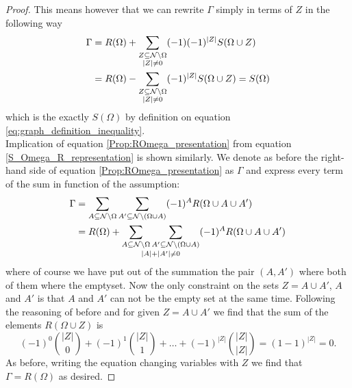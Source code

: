 \documentclass[10pt, a4paper]{amsart}
\begin{document}
\begin{proof}
This means however that we can rewrite $\Gamma$ simply in terms of $Z$ in the following way 
\begin{align*}
\Gamma &= R(\Omega) + 
\sum_{
\substack{Z\subseteq \mathcal{N}\backslash \Omega \\
|Z| \neq 0}}
(-1)(-1)^{|Z|}S(\Omega \cup Z)\\
& = 
R(\Omega) -
\sum_{
\substack{
Z\subseteq \mathcal{N}\backslash \Omega \\
|Z| \neq 0}}
(-1)^{|Z|}S(\Omega \cup Z) = S(\Omega)
\end{align*}
which is the exactly $S(\Omega)$ by definition on equation \ref{eq:graph_definition_inequality}. \\

Implication of equation \ref{Prop:ROmega_presentation} from equation \ref{S_Omega_R_representation} is shown similarly. We denote as before the right-hand side of equation \ref{Prop:ROmega_presentation} as $\Gamma$ and express every term of the sum in function of the assumption:
\begin{align*}
\Gamma &=
 \sum_{A\subseteq \mathcal{N} \backslash \Omega}\sum_{A'\subseteq \mathcal{N} \backslash (\Omega \cup A)}(-1)^{A}  R(\Omega \cup A \cup A')\\
 &= R(\Omega ) + 
 \underset{|A|+|A'|\neq 0}{\sum_{A\subseteq \mathcal{N} \backslash \Omega}\sum_{A'\subseteq \mathcal{N} \backslash (\Omega \cup A)}}
 (-1)^{A}  R(\Omega \cup A \cup A')
\end{align*}
where of course we have put out of the summation the pair $(A, A')$ where both of them where the emptyset. Now the only constraint on the sets $Z = A \cup A'$, $A$ and $A'$ is that $A$ and $A'$ can not be the empty set at the same time. Following the reasoning of before and for given $Z = A \cup A'$ we find that the sum of the elements $R(\Omega \cup Z )$ is 
$$
(-1)^{0}\binom{|Z|}{0} + (-1)^{1}\binom{|Z|}{1} + \ldots + (-1)^{|Z|}\binom{|Z|}{|Z|} = (1-1)^{|Z|} = 0.
$$
As before, writing the equation changing variables with $Z$ we find that $\Gamma = R(\Omega )$ as desired. 

\end{proof}
\end{document}
